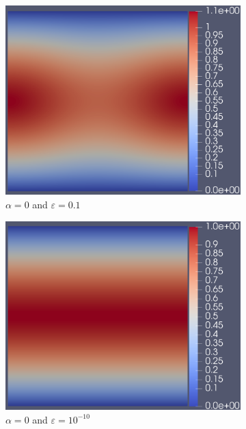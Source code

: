 \documentclass[12pt]{ociamthesis}
\begin{document}
\begin{figure}[H]
 \begin{subfigure}{0.5\textwidth}
     \includegraphics[width=\textwidth]{Pics/uf/U_E1a_eps1.png}
     \caption{$\alpha=0$ and $\varepsilon = 0.1$}
 \end{subfigure}
   \begin{subfigure}{0.5\textwidth}
     \includegraphics[width=\textwidth]{Pics/uf/U_E1a_eps10.png}
     \caption{$\alpha=0$ and $\varepsilon = 10^{-10}$}
 \end{subfigure}
 \begin{subfigure}{0.5\textwidth}

\end{subfigure}
\end{figure}
\end{document}
